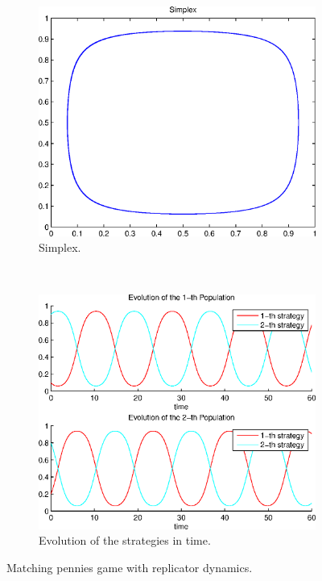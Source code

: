 \documentclass[a4paper,10pt]{article}
\begin{document}
\begin{figure}[h]
  \centering
  \begin{subfigure}[b]{0.45\textwidth}
	  \includegraphics[width=\textwidth]{./images/test2_simplex_rd.eps}
	  \caption{Simplex.}
	  \label{fig:test2_simplex_rd}
  \end{subfigure}
  ~ 
  \begin{subfigure}[b]{0.45\textwidth}
	  \includegraphics[width=\textwidth]{./images/test2_ev_rd.eps}
	  \caption{Evolution of the strategies in time.}
	  \label{fig:test2_ev_rd}
  \end{subfigure}
  \caption{Matching pennies game with replicator dynamics.}
  \label{fig:mp_game_rd}
\end{figure}
\end{document}

